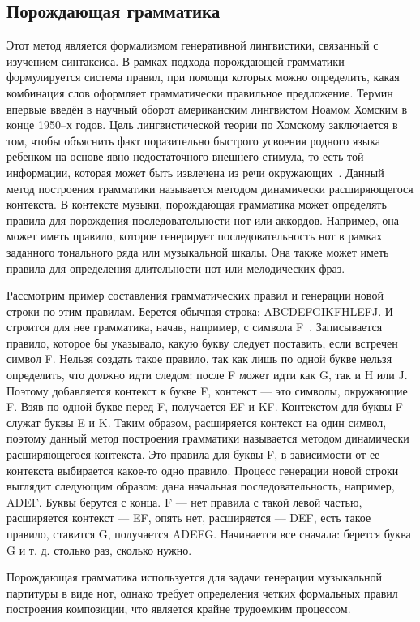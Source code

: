 \subsection{Порождающая грамматика}
Этот метод является формализмом генеративной лингвистики, связанный с изучением синтаксиса. В рамках подхода порождающей грамматики формулируется система правил, при помощи которых можно определить, какая комбинация слов оформляет грамматически правильное предложение. Термин впервые введён в научный оборот американским лингвистом Ноамом Хомским в конце 1950–х годов. Цель лингвистической теории по Хомскому заключается в том, чтобы объяснить факт поразительно быстрого усвоения родного языка ребенком на основе явно недостаточного внешнего стимула, то есть той информации, которая может быть извлечена из речи окружающих~\cite{methods}. Данный метод построения грамматики называется методом динамически расширяющегося контекста. В контексте музыки, порождающая грамматика может определять правила для порождения последовательности нот или аккордов. Например, она может иметь правило, которое генерирует последовательность нот в рамках заданного тонального ряда или музыкальной шкалы. Она также может иметь правила для определения длительности нот или мелодических фраз.

Рассмотрим пример составления грамматических правил и генерации новой строки по этим правилам. Берется обычная строка: ABCDEFGIKFHLEFJ. И строится для нее грамматика, начав, например, с символа F~\cite{notes}. Записывается правило, которое бы указывало, какую букву следует поставить, если встречен символ F. Нельзя создать такое правило, так как лишь по одной букве нельзя определить, что должно идти следом: после F может идти как G, так и H или J. Поэтому добавляется контекст к букве F, контекст — это символы, окружающие F. Взяв по одной букве перед F, получается EF и KF. Контекстом для буквы F служат буквы E и K. Таким образом, расширяется контекст на один символ, поэтому данный метод построения грамматики называется методом динамически расширяющегося контекста. Это правила для буквы F, в зависимости от ее контекста выбирается какое-то одно правило. Процесс генерации новой строки выглядит следующим образом: дана начальная последовательность, например, ADEF. Буквы берутся с конца. F — нет правила с такой левой частью, расширяется контекст — EF, опять нет, расширяется — DEF, есть такое правило, ставится G, получается ADEFG. Начинается все сначала: берется буква G и т. д. столько раз, сколько нужно.

Порождающая грамматика используется для задачи генерации музыкальной партитуры в виде нот, однако требует определения четких формальных правил построения композиции, что является крайне трудоемким процессом.


